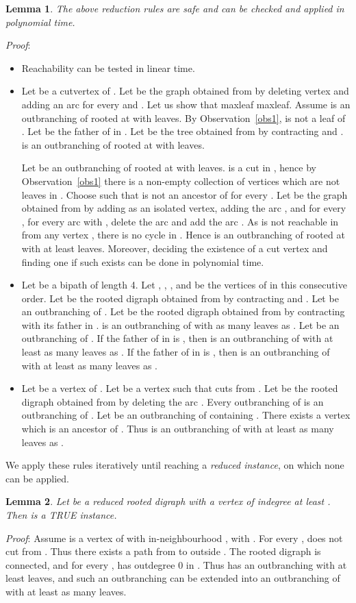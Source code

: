 \documentclass{article}
\newtheorem{lemma}{Lemma}
\begin{document}
\begin{lemma}\label{rules}
The above reduction rules are safe and can be checked and applied in polynomial time.
\end{lemma}
\emph{Proof}:
\begin{itemize}
\item[(0)] Reachability can be tested in linear time.
\item[(1)] Let  be a cutvertex of . Let  be the graph obtained from  by deleting vertex  and adding an arc  for every  and . Let us show that maxleaf  maxleaf. Assume  is an outbranching of  rooted at  with  leaves. By Observation~\ref{obs1},  is not a leaf of . Let  be the father of  in . Let  be the tree obtained from  by contracting  and .  is an outbranching of  rooted at  with  leaves. 

Let  be an outbranching of  rooted at  with  leaves.  is a cut in , hence by Observation~\ref{obs1} there is a non-empty collection of vertices  which are not leaves in . Choose  such that  is not an ancestor of  for every . Let  be the graph obtained from  by adding  as an isolated vertex, adding the arc , and for every , for every arc  with , delete the arc  and add the arc . As  is not reachable in  from any vertex , there is no cycle in . Hence  is an outbranching of  rooted at  with at least  leaves. Moreover, deciding the existence of a cut vertex and finding one if such exists can be done in polynomial time.
\item[(2)] Let  be a bipath of length 4. Let , , ,  and  be the vertices of  in this consecutive order. Let  be the rooted digraph obtained from  by contracting  and . Let  be an outbranching of . Let  be the rooted digraph obtained from  by contracting  with its father in .  is an outbranching of  with as many leaves as . Let  be an outbranching of . If the father of  in  is , then  is an outbranching of  with at least as many leaves as . If the father of  in  is , then  is an outbranching of  with at least as many leaves as .
\item[(3)] Let  be a vertex of . Let  be a vertex such that  cuts  from . Let  be the rooted digraph obtained from  by deleting the arc . Every outbranching of  is an outbranching of . Let  be an outbranching of  containing . There exists a vertex  which is an ancestor of . Thus  is an outbranching of  with at least as many leaves as .
\end{itemize}





We apply these rules iteratively until reaching a \emph{reduced instance}, on which none can be applied.
\begin{lemma}\label{largedegree}
Let  be a reduced rooted digraph with a vertex of indegree at least . Then  is a TRUE instance. 
\end{lemma}
\emph{Proof}: Assume  is a vertex of  with in-neighbourhood , with . For every ,  does not cut  from . Thus there exists a path  from  to  outside . The rooted digraph  is connected, and for every ,  has outdegree 0 in . Thus  has an outbranching with at least  leaves, and such an outbranching can be extended into an outbranching of  with at least as many leaves. 
\end{document}
